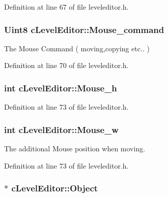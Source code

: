Definition at line 67 of file leveleditor.\-h.

\hypertarget{classc_level_editor_ad8c34053eaa9c6d35524c97ca5161fb2}{
\subsubsection[{Mouse\-\_\-command}]{\setlength{\rightskip}{0pt plus 5cm}Uint8 c\-Level\-Editor\-::\-Mouse\-\_\-command}}\label{classc_level_editor_ad8c34053eaa9c6d35524c97ca5161fb2}


The Mouse Command ( moving,copying etc.. ) 



Definition at line 70 of file leveleditor.\-h.

\hypertarget{classc_level_editor_a7efa035ab3b247bf78b2b60dead823d5}{
\subsubsection[{Mouse\-\_\-h}]{\setlength{\rightskip}{0pt plus 5cm}int c\-Level\-Editor\-::\-Mouse\-\_\-h}}\label{classc_level_editor_a7efa035ab3b247bf78b2b60dead823d5}


Definition at line 73 of file leveleditor.\-h.

\hypertarget{classc_level_editor_a32f6f1d993d0f232b1a4ad3a677d8d04}{
\subsubsection[{Mouse\-\_\-w}]{\setlength{\rightskip}{0pt plus 5cm}int c\-Level\-Editor\-::\-Mouse\-\_\-w}}\label{classc_level_editor_a32f6f1d993d0f232b1a4ad3a677d8d04}


The additional Mouse position when moving. 



Definition at line 73 of file leveleditor.\-h.

\hypertarget{classc_level_editor_a9a98c763805e3bb1a8bcc22ba4d82402}{
\subsubsection[{Object}]{$\ast$ c\-Level\-Editor\-::\-Object}}\label{classc_level_editor_a9a98c763805e3bb1a8bcc22ba4d82402}


